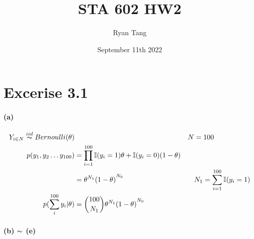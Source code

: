 \documentclass[11pt, letterpaper]{article}
\title{STA 602 HW2}
\author{Ryan Tang}
\date{September 11th 2022}
\begin{document}
\maketitle

\section{Excerise 3.1}
\paragraph{(a)}
\begin{align*}
    Y_{i\in N} \overset{iid}{\thicksim} Bernoulli(\theta) && N &= 100 \\
    p(y_1, y_2 \dots y_{100}) &= \prod_{i=1}^{100} \mathbb{I}(y_i=1)\theta + \mathbb{I}(y_i=0)(1-\theta) \\
        &= {\theta^{N_1}(1-\theta)}^{N_0} && N_1 = \sum_{i=1}^{100} \mathbb{I}(y_i=1) \\
    p(\sum_i^{100} y_i | \theta) &= {100 \choose N_1} {\theta^{N_1}(1-\theta)}^{N_0}
\end{align*}

\paragraph{(b) $\thicksim$ (e)}
\end{document}
